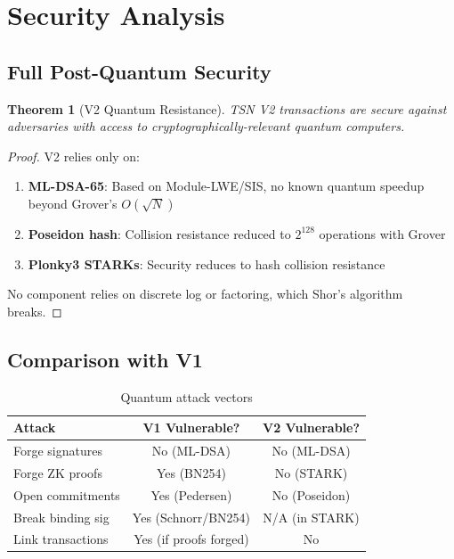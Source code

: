 \documentclass[11pt,a4paper]{article}
\newtheorem{theorem}{Theorem}
\begin{document}
\section{Security Analysis}

\subsection{Full Post-Quantum Security}

\begin{theorem}[V2 Quantum Resistance]
TSN V2 transactions are secure against adversaries with access to cryptographically-relevant quantum computers.
\end{theorem}

\begin{proof}
V2 relies only on:
\begin{enumerate}
    \item \textbf{ML-DSA-65}: Based on Module-LWE/SIS, no known quantum speedup beyond Grover's $O(\sqrt{N})$
    \item \textbf{Poseidon hash}: Collision resistance reduced to $2^{128}$ operations with Grover
    \item \textbf{Plonky3 STARKs}: Security reduces to hash collision resistance
\end{enumerate}
No component relies on discrete log or factoring, which Shor's algorithm breaks.
\end{proof}

\subsection{Comparison with V1}

\begin{table}[h]
\centering
\begin{tabular}{lcc}
\toprule
Attack & V1 Vulnerable? & V2 Vulnerable? \\
\midrule
Forge signatures & No (ML-DSA) & No (ML-DSA) \\
Forge ZK proofs & Yes (BN254) & No (STARK) \\
Open commitments & Yes (Pedersen) & No (Poseidon) \\
Break binding sig & Yes (Schnorr/BN254) & N/A (in STARK) \\
Link transactions & Yes (if proofs forged) & No \\
\bottomrule
\end{tabular}
\caption{Quantum attack vectors}
\end{table}
\end{document}
